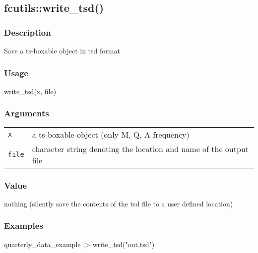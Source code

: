 \documentclass[
  letterpaper,
  DIV=11,
  numbers=noendperiod]{scrreport}
\newenvironment{Shaded}{\begin{snugshade}}{\end{snugshade}}
\newcommand{\FunctionTok}[1]{\textcolor[rgb]{0.28,0.35,0.67}{#1}}
\newcommand{\NormalTok}[1]{\textcolor[rgb]{0.00,0.23,0.31}{#1}}
\newcommand{\SpecialCharTok}[1]{\textcolor[rgb]{0.37,0.37,0.37}{#1}}
\newcommand{\StringTok}[1]{\textcolor[rgb]{0.13,0.47,0.30}{#1}}
\begin{document}
\subsection{fcutils::write\_tsd()}\label{fcutilswrite_tsd}

\subsubsection{Description}\label{description-7}

Save a ts-boxable object in tsd format

\subsubsection{Usage}\label{usage-7}

\begin{Shaded}
\begin{Highlighting}[]
\FunctionTok{write\_tsd}\NormalTok{(x, file)}
\end{Highlighting}
\end{Shaded}

\subsubsection{Arguments}\label{arguments-7}

\begin{longtable}[]{@{}ll@{}}
\toprule\noalign{}
\endhead
\bottomrule\noalign{}
\endlastfoot
\texttt{x} & a ts-boxable object (only M, Q, A frequency) \\
\texttt{file} & character string denoting the location and name of the
output file \\
\end{longtable}

\subsubsection{Value}\label{value-7}

nothing (silently save the contents of the tsd file to a user defined
location)

\subsubsection{Examples}\label{examples-7}

\begin{Shaded}
\begin{Highlighting}[]
\NormalTok{quarterly\_data\_example }\SpecialCharTok{|\textgreater{}} \FunctionTok{write\_tsd}\NormalTok{(}\StringTok{"out.tsd"}\NormalTok{)}
\end{Highlighting}
\end{Shaded}
\end{document}
